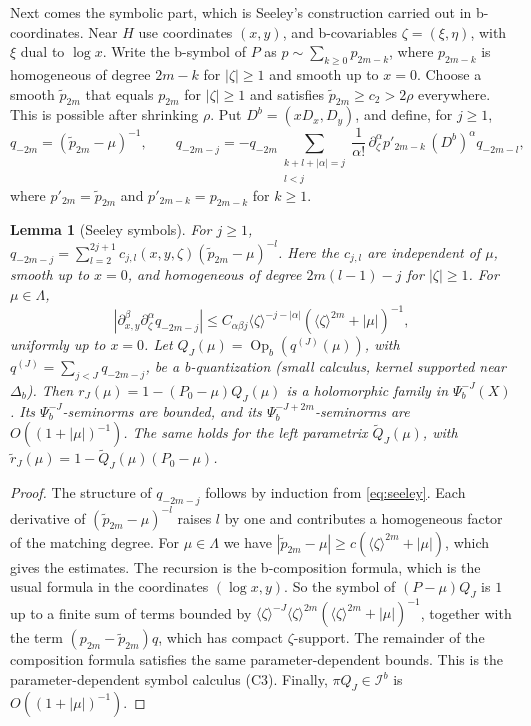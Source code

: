 \documentclass[11pt,oneside,reqno]{article}
\newcommand{\Ib}{\mathcal I^b}
\theoremstyle{plain}
\newtheorem{lemma}[theorem]{Lemma}
\theoremstyle{definition}
\theoremstyle{remark}
\begin{document}
Next comes the symbolic part, which is Seeley's construction
\cite{SeeleyCP} carried out in b-coordinates. Near \(H\) use coordinates
\((x,y)\), and b-covariables \(\zeta=(\xi,\eta)\), with \(\xi\) dual to
\(\log x\). Write the b-symbol of \(P\) as
\(p\sim\sum_{k\geq0}p_{2m-k}\), where \(p_{2m-k}\) is homogeneous of degree
\(2m-k\) for \(|\zeta|\geq1\) and smooth up to \(x=0\). Choose a smooth
\(\tilde p_{2m}\) that equals \(p_{2m}\) for \(|\zeta|\geq1\) and satisfies
\(\tilde p_{2m}\geq c_2>2\rho\) everywhere. This is possible after
shrinking \(\rho\). Put \(D^b=(xD_x,D_y)\), and define, for \(j\geq1\),
\begin{equation}\label{eq:seeley}
 q_{-2m}=(\tilde p_{2m}-\mu)^{-1},\qquad
 q_{-2m-j}=-q_{-2m}\sum_{\substack{k+l+|\alpha|=j\\ l<j}}\frac1{\alpha!}
 \,\partial_\zeta^\alpha p'_{2m-k}\,(D^b)^\alpha q_{-2m-l},
\end{equation}
where \(p'_{2m}=\tilde p_{2m}\) and \(p'_{2m-k}=p_{2m-k}\) for \(k\geq1\).

\begin{lemma}[Seeley symbols]\label{lem:seeley}
For \(j\geq1\),
\(q_{-2m-j}=\sum_{l=2}^{2j+1}c_{j,l}(x,y,\zeta)(\tilde p_{2m}-\mu)^{-l}\).
Here the \(c_{j,l}\) are independent of \(\mu\), smooth up to \(x=0\), and
homogeneous of degree \(2m(l-1)-j\) for \(|\zeta|\geq1\). For
\(\mu\in\Lambda\),
\[
 |\partial_{x,y}^\beta\partial_\zeta^\alpha q_{-2m-j}|\leq
 C_{\alpha\beta j}\langle\zeta\rangle^{-j-|\alpha|}
 (\langle\zeta\rangle^{2m}+|\mu|)^{-1},
\]
uniformly up to \(x=0\). Let \(Q_J(\mu)=\operatorname{Op}_b(q^{(J)}(\mu))\),
with \(q^{(J)}=\sum_{j<J}q_{-2m-j}\), be a b-quantization (small calculus,
kernel supported near \(\Delta_b\)). Then
\(r_J(\mu)=1-(P_0-\mu)Q_J(\mu)\) is a holomorphic family in
\(\Psi_b^{-J}(X)\). Its \(\Psi_b^{-J}\)-seminorms are bounded, and its
\(\Psi_b^{-J+2m}\)-seminorms are \(O((1+|\mu|)^{-1})\). The same holds for
the left parametrix \(\tilde Q_J(\mu)\), with
\(\tilde r_J(\mu)=1-\tilde Q_J(\mu)(P_0-\mu)\).
\end{lemma}

\begin{proof}
The structure of \(q_{-2m-j}\) follows by induction from \eqref{eq:seeley}.
Each derivative of \((\tilde p_{2m}-\mu)^{-l}\) raises \(l\) by one and
contributes a homogeneous factor of the matching degree. For
\(\mu\in\Lambda\) we have
\(|\tilde p_{2m}-\mu|\geq c(\langle\zeta\rangle^{2m}+|\mu|)\), which gives the
estimates. The recursion is the b-composition formula, which is the usual
formula in the coordinates \((\log x,y)\). So the symbol of
\((P-\mu)Q_J\) is \(1\) up to a finite sum of terms bounded by
\(\langle\zeta\rangle^{-J}\langle\zeta\rangle^{2m}(\langle\zeta\rangle^{2m}
+|\mu|)^{-1}\), together with the term \((p_{2m}-\tilde p_{2m})q\), which has
compact \(\zeta\)-support. The remainder of the composition formula
satisfies the same parameter-dependent bounds. This is the
parameter-dependent symbol calculus (C3). Finally, \(\pi Q_J\in\Ib\) is
\(O((1+|\mu|)^{-1})\).
\end{proof}
\end{document}
